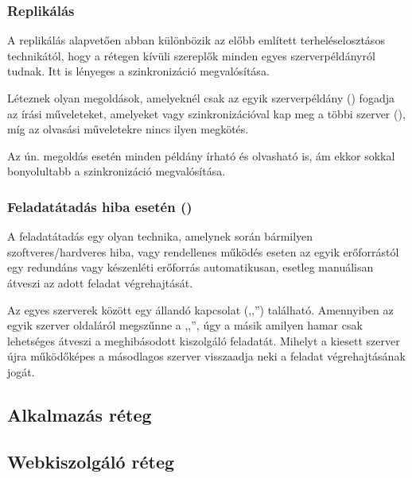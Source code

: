 
\subsubsection{Replikálás}

A replikálás alapvetően abban különbözik az előbb említett terheléselosztásos technikától, hogy a rétegen kívüli szereplők minden egyes szerverpéldányról tudnak. Itt is lényeges a szinkronizáció megvalósítása.

Léteznek olyan megoldások, amelyeknél csak az egyik szerverpéldány () fogadja az írási műveleteket, amelyeket  vagy  szinkronizációval kap meg a többi szerver (), míg az olvasási műveletekre nincs ilyen megkötés.

Az ún.  megoldás esetén minden példány írható és olvasható is, ám ekkor sokkal bonyolultabb a szinkronizáció megvalósítása.


\subsubsection{Feladatátadás hiba esetén ()}

A feladatátadás egy olyan technika, amelynek során bármilyen szoftveres/hardveres hiba, vagy rendellenes működés eseten az egyik erőforrástól egy redundáns vagy készenléti erőforrás automatikusan, esetleg manuálisan átveszi az adott feladat végrehajtását.

Az egyes szerverek között egy állandó kapcsolat (,,'') található. Amennyiben az egyik szerver oldaláról megszűnne a ,,'', úgy a másik amilyen hamar csak lehetséges átveszi a meghibásodott kiszolgáló feladatát. Mihelyt a kiesett szerver újra működőképes a másodlagos szerver visszaadja neki a feladat végrehajtásának jogát.


\subsection{Alkalmazás réteg}


\subsection{Webkiszolgáló réteg}

